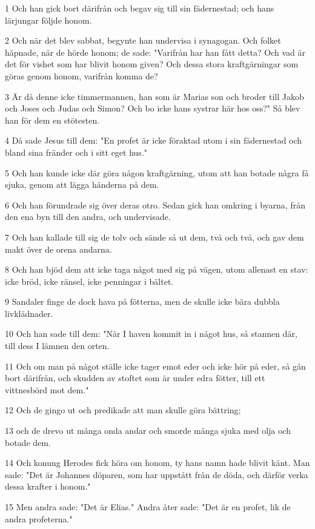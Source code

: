 \par 1 Och han gick bort därifrån och begav sig till sin fädernestad; och hans lärjungar följde honom.
\par 2 Och när det blev sabbat, begynte han undervisa i synagogan. Och folket häpnade, när de hörde honom; de sade: "Varifrån har han fått detta? Och vad är det för vishet som har blivit honom given? Och dessa stora kraftgärningar som göras genom honom, varifrån komma de?
\par 3 Är då denne icke timmermannen, han som är Marias son och broder till Jakob och Joses och Judas och Simon? Och bo icke hans systrar här hos oss?" Så blev han för dem en stötesten.
\par 4 Då sade Jesus till dem: "En profet är icke föraktad utom i sin fädernestad och bland sina fränder och i sitt eget hus."
\par 5 Och han kunde icke där göra någon kraftgärning, utom att han botade några få sjuka, genom att lägga händerna på dem.
\par 6 Och han förundrade sig över deras otro. Sedan gick han omkring i byarna, från den ena byn till den andra, och undervisade.
\par 7 Och han kallade till sig de tolv och sände så ut dem, två och två, och gav dem makt över de orena andarna.
\par 8 Och han bjöd dem att icke taga något med sig på vägen, utom allenast en stav: icke bröd, icke ränsel, icke penningar i bältet.
\par 9 Sandaler finge de dock hava på fötterna, men de skulle icke bära dubbla livklädnader.
\par 10 Och han sade till dem: "När I haven kommit in i något hus, så stannen där, till dess I lämnen den orten.
\par 11 Och om man på något ställe icke tager emot eder och icke hör på eder, så gån bort därifrån, och skudden av stoftet som är under edra fötter, till ett vittnesbörd mot dem."
\par 12 Och de gingo ut och predikade att man skulle göra bättring;
\par 13 och de drevo ut många onda andar och smorde många sjuka med olja och botade dem.
\par 14 Och konung Herodes fick höra om honom, ty hans namn hade blivit känt. Man sade: "Det är Johannes döparen, som har uppstått från de döda, och därför verka dessa krafter i honom."
\par 15 Men andra sade: "Det är Elias." Andra åter sade: "Det är en profet, lik de andra profeterna."
